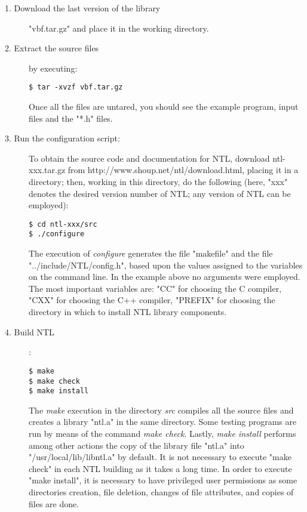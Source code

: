 \begin{description}
\item[1. Download the last version of the library] "vbf.tar.gz" and place it in the working directory.

\item[2. Extract the source files] by executing:
\begin{verbatim}
$ tar -xvzf vbf.tar.gz
\end{verbatim}

Once all the files are untared, you should see the example program, input files and the "*.h" files. 

\item[3. Run the configuration script:]
To obtain the source code and documentation for NTL, download ntl-xxx.tar.gz
from http://www.shoup.net/ntl/download.html, placing it in a directory; then,
working in this directory, do the following (here, "xxx" denotes the
desired version number of NTL; any version of NTL can be employed):
\begin{verbatim}
$ cd ntl-xxx/src
$ ./configure
\end{verbatim}

The execution of {\em configure\/} generates the file "makefile" and the file "../include/NTL/config.h", based upon the values assigned to the variables on the command line. In the example above no arguments were employed. The most important variables are: "CC" for choosing the C compiler,
"CXX" for choosing the C++ compiler, "PREFIX" for choosing the directory in which to install NTL library components.

\item[4. Build NTL]:
\begin{verbatim}
$ make
$ make check
$ make install
\end{verbatim}

The {\em make\/} execution in the directory {\em src\/} compiles all the source files and creates a library "ntl.a" in the same directory. Some testing programs are run by means of the command {\em make check\/}. Lastly, {\em make install\/} performs among other actions the copy of the library file "ntl.a" into "/usr/local/lib/libntl.a" by default. It is not necessary to execute "make check" in each NTL building as it takes a long time. In order to execute "make install", it is necessary to have privileged user permissions as some directories creation, file deletion, changes of file attributes, and copies of files are done.

\end{description}

